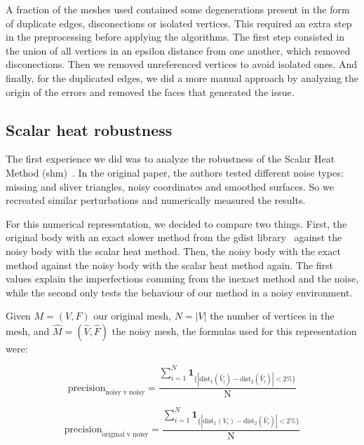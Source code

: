 \documentclass[sigconf]{acmart}
\begin{document}
A fraction of the meshes used contained some degenerations present in the form of duplicate edges, disconections or isolated vertices.
This required an extra step in the preprocessing before applying the algorithms. The first step consisted in the union of all vertices in
an epsilon distance from one another, which removed disconections. Then we removed unreferenced vertices to avoid isolated ones. And finally,
for the duplicated edges, we did a more manual approach by analyzing the origin of the errors and removed the faces that generated the issue. 

\subsection{Scalar heat robustness}

The first experience we did was to analyze the robustness of the Scalar Heat Method (shm)~\cite{Crane:2017:HMD}. In
the original paper, the authors tested different noise types: missing and sliver triangles,
noisy coordinates and smoothed surfaces. So we recreated similar perturbations and numerically
measured the results.

For this numerical representation, we decided to compare two things. First, the original body
with an exact slower method from the gdist library~\cite{exact_method_algorithm}\cite{exact_method_library}
against the noisy body with the scalar heat method.
Then, the noisy body with the exact method against the noisy body with the scalar heat method again.
The first values explain the imperfections comming from the inexact method and the noise, while
the second only tests the behaviour of our method in a noisy environment.

Given $M = (V, F)$ our original mesh, $N = |V|$ the number of vertices in the mesh, and $\hat{M} = (\hat{V}, \hat{F})$ the noisy mesh,
the formulas used for this representation were:

\begin{equation} \label{eq:nvn_precision}
  \text{precision}_{\text{noisy v noisy}} = \frac{\sum_{i=1}^N \mathbf{1}_{\{|\text{dist}_1(\hat{V}_i) - \text{dist}_2(\hat{V}_i)| < 2\%\}}}{\text{N}} 
\end{equation}

\begin{equation} \label{eq:ovn_precision}
  \text{precision}_{\text{original v noisy}} = \frac{\sum_{i=1}^N \mathbf{1}_{\{|\text{dist}_1(V_i) - \text{dist}_2(\hat{V}_i)| < 2\%\}}}{\text{N}} 
\end{equation}
\end{document}
